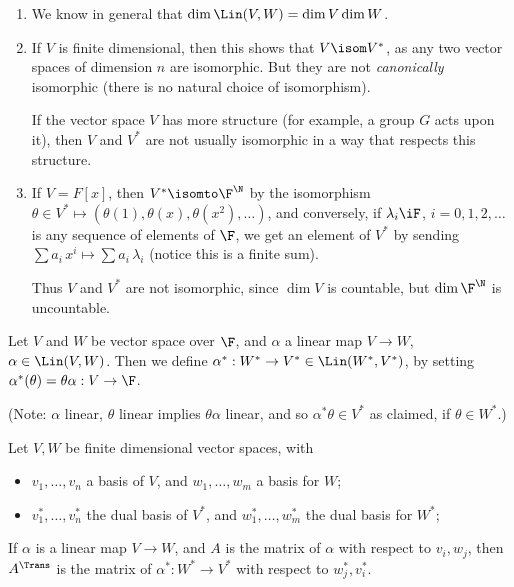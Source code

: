 \begin{remarks}
\mbox{}
\begin{enumerate}
	\item We know in general that $\dim \Lin(V,W)=\dim V \dim W$.
	\item If $V$ is finite dimensional, then this shows that $V\isom V^*$, as any two vector spaces of dimension $n$ are isomorphic. But they are not \emph{canonically} isomorphic (there is no natural choice of isomorphism). %
	
	If the vector space $V$ has more structure (for example, a group $G$ acts upon it), then $V$ and $V^*$ are not usually isomorphic in a way that respects this structure. %
	
	\item If $V=F[x]$, then $V^* \isomto \F^\N$ by the isomorphism $\theta\in V^* \mapsto (\theta(1),\theta(x),\theta(x^2),\ldots)$, and conversely, if $\lambda_i\iF$, $i=0,1,2,\ldots$ is any sequence of elements of $\F$,  we get an element of $V^*$ by sending $\sum a_i \, x^i \mapsto \sum a_i\,\lambda_i$ (notice this is a finite sum). %
	
	Thus $V$ and $V^*$ are not isomorphic, since $\dim V$ is countable, but $\dim \F^\N$ is uncountable.
\end{enumerate}
\end{remarks}

\begin{definition}
	Let $V$ and $W$ be vector space over $\F$, and $\alpha$ a linear map $V\to W$, $\alpha\in \Lin(V,W)$. Then we define $\alpha^*:W^*\to V^* \in \Lin(W^*,V^*)$, by setting $\alpha^*(\theta) = \theta\alpha:V\to\F$. %
	
	(Note: $\alpha$ linear, $\theta$ linear implies $\theta\alpha$ linear, and so $\alpha^*\theta\in V^*$ as claimed, if $\theta\in W^*$.) %
\end{definition}

\begin{lemma}
	Let $V,W$ be finite dimensional vector spaces, with %
	\begin{itemize}
		\shortskip
		\item [] $v_1,\ldots,v_n$ a basis of $V$, and $w_1,\ldots,w_m$ a basis for $W$;
		\item [] $v_1^*,\ldots,v_n^*$ the dual basis of $V^*$, and $w_1^*,\ldots,w_m^*$ the dual basis for $W^*$; %
	\end{itemize}
	If $\alpha$ is a linear map $V\to W$, and $A$ is the matrix of $\alpha$ with respect to $v_i,w_j$, then $A^\Trans$ is the matrix of $\alpha^*:W^*\to V^*$ with respect to $w_j^*,v_i^*$.
\end{lemma}

